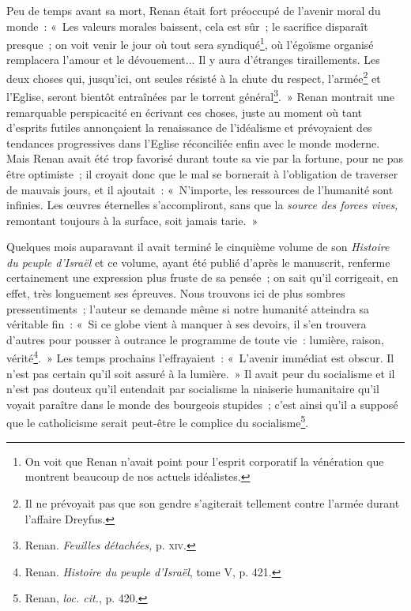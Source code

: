 \documentclass[french,twoside]{book} %
\begin{document}
\noindent Peu de temps avant sa mort, Renan était fort préoccupé de l’avenir moral du monde : « Les valeurs morales baissent, cela est sûr ; le sacrifice disparaît presque ; on voit venir le jour où tout sera syndiqué\footnote{ \noindent On voit que Renan n’avait point pour l’esprit corporatif la vénération que montrent beaucoup de nos actuels idéalistes.
 }, où l’égoïsme organisé remplacera l’amour et le dévouement... Il y aura d’étranges tiraillements. Les deux choses qui,  jusqu’ici, ont seules résisté à la chute du respect, l’armée\footnote{ \noindent Il ne prévoyait pas que son gendre s’agiterait tellement contre l’armée durant l’affaire Dreyfus.
 } et l’Eglise, seront bientôt entraînées par le torrent général\footnote{ \noindent Renan. \emph{Feuilles détachées,} p. {\scshape xiv}.
 }. » Renan montrait une remarquable perspicacité en écrivant ces choses, juste au moment où tant d’esprits futiles annonçaient la renaissance de l’idéalisme et prévoyaient des tendances progressives dans l’Eglise réconciliée enfin avec le monde moderne. Mais Renan avait été trop favorisé durant toute sa vie par la fortune, pour ne pas être optimiste ; il croyait donc que le mal se bornerait à l’obligation de traverser de mauvais jours, et il ajoutait : « N’importe, les ressources de l’humanité sont infinies. Les œuvres éternelles s’accompliront, sans que la \emph{source des forces vives,} remontant toujours à la surface, soit jamais tarie. »\par
Quelques mois auparavant il avait terminé le cinquième volume de son \emph{Histoire du peuple d’Israël} et ce volume, ayant été publié d’après le manuscrit, renferme certainement une expression plus fruste de sa pensée ; on sait qu’il corrigeait, en effet, très longuement ses épreuves. Nous trouvons ici de plus sombres pressentiments ; l’auteur se demande même si notre humanité atteindra sa véritable fin : « Si ce globe vient à manquer à ses devoirs, il s’en trouvera d’autres pour pousser à outrance le programme de toute vie : lumière, raison, vérité\footnote{ \noindent Renan. \emph{Histoire du peuple d’Israël}, tome V, p. 421.
 }. » Les temps prochains l’effrayaient : « L’avenir immédiat est obscur. Il n’est pas certain qu’il soit assuré à la lumière. »  Il avait peur du socialisme et il n’est pas douteux qu’il entendait par socialisme la niaiserie humanitaire qu’il voyait paraître dans le monde des bourgeois stupides ; c’est ainsi qu’il a supposé que le catholicisme serait peut-être le complice du socialisme\footnote{ \noindent Renan, \emph{loc. cit.}, p. 420.
 }.\par
\end{document}
